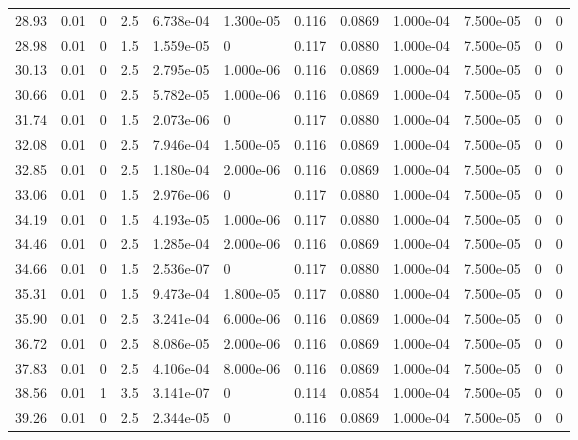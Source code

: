 \documentclass[preview]{standalone}
\begin{document}
{{{\begin{tabular}{L{1.2cm}C{1.2cm} C{0.3cm}C{0.5cm} C{1.4cm}C{1.4cm} C{1.4cm}C{1.4cm} C{1.6cm}C{1.6cm} C{1.6cm}C{1.6cm}}
  28.93  &  0.01  & 0     & 2.5 &  6.738e-04  & 1.300e-05  &  0.116&   0.0869& 1.000e-04 & 7.500e-05   &  0 & 0  \\ 
  28.98  &  0.01  & 0     & 1.5 &  1.559e-05  & 0  &  0.117&   0.0880& 1.000e-04 & 7.500e-05   &  0 & 0  \\ 
  30.13  &  0.01  & 0     & 2.5 &  2.795e-05  & 1.000e-06  &  0.116&   0.0869& 1.000e-04 & 7.500e-05   &  0 & 0  \\ 
  30.66  &  0.01  & 0     & 2.5 &  5.782e-05  & 1.000e-06  &  0.116&   0.0869& 1.000e-04 & 7.500e-05   &  0 & 0  \\ 
  31.74  &  0.01  & 0     & 1.5 &  2.073e-06  & 0  &  0.117&   0.0880& 1.000e-04 & 7.500e-05   &  0 & 0  \\ 
  32.08  &  0.01  & 0     & 2.5 &  7.946e-04  & 1.500e-05  &  0.116&   0.0869& 1.000e-04 & 7.500e-05   &  0 & 0  \\ 
  32.85  &  0.01  & 0     & 2.5 &  1.180e-04  & 2.000e-06  &  0.116&   0.0869& 1.000e-04 & 7.500e-05   &  0 & 0  \\ 
  33.06  &  0.01  & 0     & 1.5 &  2.976e-06  & 0  &  0.117&   0.0880& 1.000e-04 & 7.500e-05   &  0 & 0  \\ 
  34.19  &  0.01  & 0     & 1.5 &  4.193e-05  & 1.000e-06  &  0.117&   0.0880& 1.000e-04 & 7.500e-05   &  0 & 0  \\ 
  34.46  &  0.01  & 0     & 2.5 &  1.285e-04  & 2.000e-06  &  0.116&   0.0869& 1.000e-04 & 7.500e-05   &  0 & 0  \\ 
  34.66  &  0.01  & 0     & 1.5 &  2.536e-07  & 0  &  0.117&   0.0880& 1.000e-04 & 7.500e-05   &  0 & 0  \\ 
  35.31  &  0.01  & 0     & 1.5 &  9.473e-04  & 1.800e-05  &  0.117&   0.0880& 1.000e-04 & 7.500e-05   &  0 & 0  \\ 
  35.90  &  0.01  & 0     & 2.5 &  3.241e-04  & 6.000e-06  &  0.116&   0.0869& 1.000e-04 & 7.500e-05   &  0 & 0  \\ 
  36.72  &  0.01  & 0     & 2.5 &  8.086e-05  & 2.000e-06  &  0.116&   0.0869& 1.000e-04 & 7.500e-05   &  0 & 0  \\ 
  37.83  &  0.01  & 0     & 2.5 &  4.106e-04  & 8.000e-06  &  0.116&   0.0869& 1.000e-04 & 7.500e-05   &  0 & 0  \\ 
  38.56  &  0.01  & 1     & 3.5 &  3.141e-07  & 0  &  0.114&   0.0854& 1.000e-04 & 7.500e-05   &  0 & 0  \\ 
  39.26  &  0.01  & 0     & 2.5 &  2.344e-05  & 0  &  0.116&   0.0869& 1.000e-04 & 7.500e-05   &  0 & 0  \\ 

\end{tabular}}}}
\end{document}
